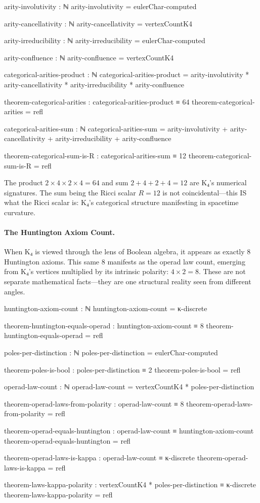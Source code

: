 \documentclass[11pt,a4paper]{book}
\begin{document}
\begin{code}
arity-involutivity : ℕ
arity-involutivity = eulerChar-computed

arity-cancellativity : ℕ
arity-cancellativity = vertexCountK4

arity-irreducibility : ℕ
arity-irreducibility = eulerChar-computed

arity-confluence : ℕ
arity-confluence = vertexCountK4

categorical-arities-product : ℕ
categorical-arities-product = arity-involutivity * arity-cancellativity 
                            * arity-irreducibility * arity-confluence

theorem-categorical-arities : categorical-arities-product ≡ 64
theorem-categorical-arities = refl

categorical-arities-sum : ℕ
categorical-arities-sum = arity-involutivity + arity-cancellativity 
                        + arity-irreducibility + arity-confluence

theorem-categorical-sum-is-R : categorical-arities-sum ≡ 12
theorem-categorical-sum-is-R = refl
\end{code}

The product $2 \times 4 \times 2 \times 4 = 64$ and sum $2 + 4 + 2 + 4 = 12$ are K₄'s numerical signatures. The sum being the Ricci scalar $R = 12$ is not coincidental—this IS what the Ricci scalar is: K₄'s categorical structure manifesting in spacetime curvature.

\paragraph{The Huntington Axiom Count.}
When K₄ is viewed through the lens of Boolean algebra, it appears as exactly 8 Huntington axioms. This same 8 manifests as the operad law count, emerging from K₄'s vertices multiplied by its intrinsic polarity: $4 \times 2 = 8$. These are not separate mathematical facts—they are one structural reality seen from different angles.

\begin{code}
huntington-axiom-count : ℕ
huntington-axiom-count = κ-discrete

theorem-huntington-equals-operad : huntington-axiom-count ≡ 8
theorem-huntington-equals-operad = refl

poles-per-distinction : ℕ
poles-per-distinction = eulerChar-computed

theorem-poles-is-bool : poles-per-distinction ≡ 2
theorem-poles-is-bool = refl

operad-law-count : ℕ
operad-law-count = vertexCountK4 * poles-per-distinction

theorem-operad-laws-from-polarity : operad-law-count ≡ 8
theorem-operad-laws-from-polarity = refl

theorem-operad-equals-huntington : operad-law-count ≡ huntington-axiom-count
theorem-operad-equals-huntington = refl

theorem-operad-laws-is-kappa : operad-law-count ≡ κ-discrete
theorem-operad-laws-is-kappa = refl

theorem-laws-kappa-polarity : vertexCountK4 * poles-per-distinction ≡ κ-discrete
theorem-laws-kappa-polarity = refl
\end{code}
\end{document}
